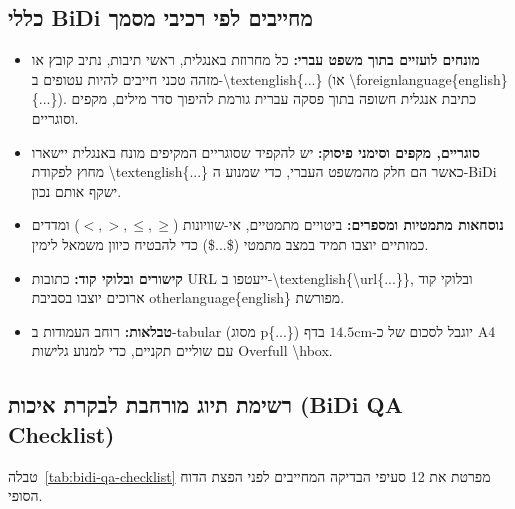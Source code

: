\subsection{כללי \textenglish{BiDi} מחייבים לפי רכיבי מסמך}
\begin{itemize}
    \item \textbf{מונחים לועזיים בתוך משפט עברי:} כל מחרוזת באנגלית, ראשי תיבות, נתיב קובץ או מזהה טכני חייבים להיות עטופים ב-\textenglish{\textbackslash textenglish\{...\}} (או \textenglish{\textbackslash foreignlanguage\{english\}\{...\}}). כתיבת אנגלית חשופה בתוך פסקה עברית גורמת להיפוך סדר מילים, מקפים וסוגריים.
    \item \textbf{סוגריים, מקפים וסימני פיסוק:} יש להקפיד שסוגריים המקיפים מונח באנגלית יישארו מחוץ לפקודת \textenglish{\textbackslash textenglish\{...\}} כאשר הם חלק מהמשפט העברי, כדי שמנוע ה-\textenglish{BiDi} ישקף אותם נכון.
    \item \textbf{נוסחאות מתמטיות ומספרים:} ביטויים מתמטיים, אי-שוויונות ($<, >, \le, \ge$) ומדדים כמותיים יוצבו תמיד במצב מתמטי (\textenglish{\$...\$}) כדי להבטיח כיוון משמאל לימין.
    \item \textbf{קישורים ובלוקי קוד:} כתובות \textenglish{URL} ייעטפו ב-\textenglish{\textbackslash textenglish\{\textbackslash url\{...\}\}}, ובלוקי קוד ארוכים יוצבו בסביבת \textenglish{otherlanguage\{english\}} מפורשת.
    \item \textbf{טבלאות:} רוחב העמודות ב-\textenglish{tabular} (מסוג \textenglish{p\{...\}}) יוגבל לסכום של כ-$14.5\text{cm}$ בדף \textenglish{A4} עם שוליים תקניים, כדי למנוע גלישות \textenglish{Overfull \textbackslash hbox}.
\end{itemize}

\subsection{רשימת תיוג מורחבת לבקרת איכות (\textenglish{BiDi QA Checklist})}
טבלה~\ref{tab:bidi-qa-checklist} מפרטת את 12 סעיפי הבדיקה המחייבים לפני הפצת הדוח הסופי.

